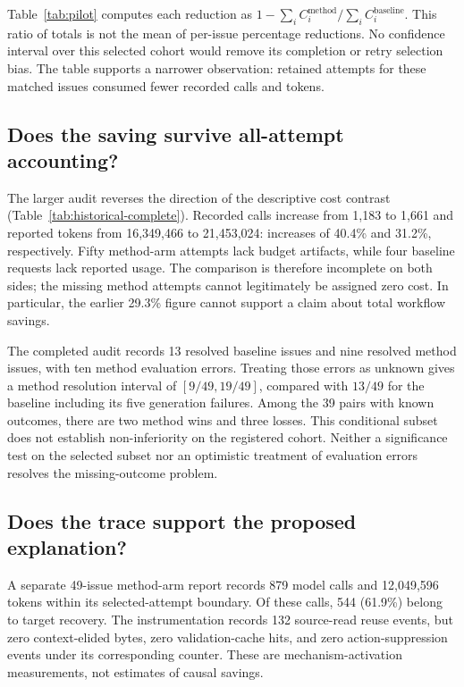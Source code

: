 \documentclass[acmsmall,screen,review,anonymous]{acmart}
\begin{document}
Table~\ref{tab:pilot} computes each reduction as $1-\sum_i C_i^{\text{method}}/\sum_i C_i^{\text{baseline}}$. This ratio of totals is not the mean of per-issue percentage reductions. No confidence interval over this selected cohort would remove its completion or retry selection bias. The table supports a narrower observation: retained attempts for these matched issues consumed fewer recorded calls and tokens.

\subsection{Does the saving survive all-attempt accounting?}
\begin{table}[t]
\caption{Completed historical 49-issue audit, including all recorded attempts. Missing usage makes token totals lower bounds, not complete bills. These arms have unequal retry histories and are not a prospective causal comparison.}
\label{tab:historical-complete}

\end{table}
The larger audit reverses the direction of the descriptive cost contrast (Table~\ref{tab:historical-complete}). Recorded calls increase from 1,183 to 1,661 and reported tokens from 16,349,466 to 21,453,024: increases of 40.4\% and 31.2\%, respectively. Fifty method-arm attempts lack budget artifacts, while four baseline requests lack reported usage. The comparison is therefore incomplete on both sides; the missing method attempts cannot legitimately be assigned zero cost. In particular, the earlier 29.3\% figure cannot support a claim about total workflow savings.

The completed audit records 13 resolved baseline issues and nine resolved method issues, with ten method evaluation errors. Treating those errors as unknown gives a method resolution interval of $[9/49,19/49]$, compared with $13/49$ for the baseline including its five generation failures. Among the 39 pairs with known outcomes, there are two method wins and three losses. This conditional subset does not establish non-inferiority on the registered cohort. Neither a significance test on the selected subset nor an optimistic treatment of evaluation errors resolves the missing-outcome problem.

\subsection{Does the trace support the proposed explanation?}
A separate 49-issue method-arm report records 879 model calls and 12,049,596 tokens within its selected-attempt boundary. Of these calls, 544 (61.9\%) belong to target recovery. The instrumentation records 132 source-read reuse events, but zero context-elided bytes, zero validation-cache hits, and zero action-suppression events under its corresponding counter. These are mechanism-activation measurements, not estimates of causal savings.
\end{document}
